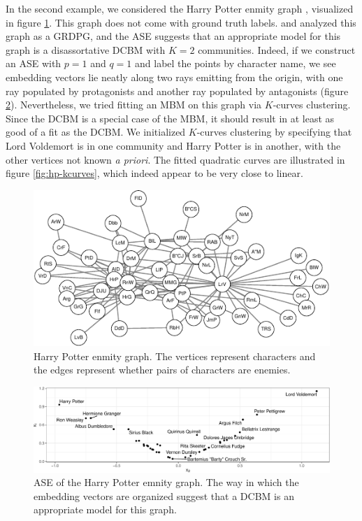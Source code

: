 \documentclass[
  12pt,
]{article}
\theoremstyle{definition}
\theoremstyle{definition}
\theoremstyle{definition}
\theoremstyle{definition}
\theoremstyle{remark}
\begin{document}
In the second example, we considered the Harry Potter enmity graph \citep{harrypotter}, visualized in figure \ref{fig:hp}.
This graph does not come with ground truth labels.
\citet{rubindelanchy2017statistical} and \citet{SannaPassino2022} analyzed this graph as a GRDPG, and the ASE suggests that an appropriate model for this graph is a disassortative DCBM with \(K = 2\) communities.
Indeed, if we construct an ASE with \(p = 1\) and \(q = 1\) and label the points by character name, we see embedding vectors lie neatly along two rays emitting from the origin, with one ray populated by protagonists and another ray populated by antagonists (figure \ref{fig:hp-ase}).
Nevertheless, we tried fitting an MBM on this graph via \(K\)-curves clustering.
Since the DCBM is a special case of the MBM, it should result in at least as good of a fit as the DCBM.
We initialized \(K\)-curves clustering by specifying that Lord Voldemort is in one community and Harry Potter is in another, with the other vertices not known \emph{a priori}.
The fitted quadratic curves are illustrated in figure \ref{fig:hp-kcurves}, which indeed appear to be very close to linear.

\begin{figure}[H]

{\centering \includegraphics{draft_files/figure-latex/hp-1} 

}

\caption{Harry Potter enmity graph. The vertices represent characters and the edges represent whether pairs of characters are enemies.}\label{fig:hp}
\end{figure}

\begin{figure}[H]

{\centering \includegraphics{draft_files/figure-latex/hp-ase-1} 

}

\caption{ASE of the Harry Potter emnity graph. The way in which the embedding vectors are organized suggest that a DCBM is an appropriate model for this graph.}\label{fig:hp-ase}
\end{figure}
\end{document}
